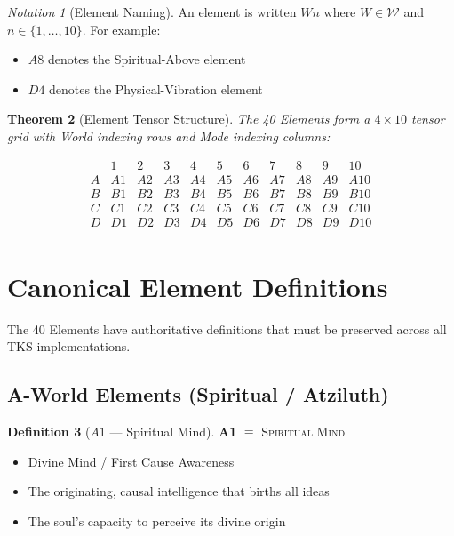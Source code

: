 \documentclass[11pt,twoside,openright]{book}
\theoremstyle{definition}
\newtheorem{definition}{Definition}[chapter]
\theoremstyle{plain}
\newtheorem{theorem}[definition]{Theorem}
\theoremstyle{remark}
\newtheorem{notation}[definition]{Notation}
\newcommand{\Worlds}{\mathcal{W}}
\begin{document}
\begin{notation}[Element Naming]
An element is written $Wn$ where $W \in \Worlds$ and $n \in \{1,\ldots,10\}$. For example:
\begin{itemize}
  \item $A8$ denotes the Spiritual-Above element
  \item $D4$ denotes the Physical-Vibration element
\end{itemize}
\end{notation}

\begin{theorem}[Element Tensor Structure]
\label{thm:element-tensor}
The 40 Elements form a $4 \times 10$ tensor grid with World indexing rows and Mode indexing columns:

\[
\begin{array}{c|cccccccccc}
 & 1 & 2 & 3 & 4 & 5 & 6 & 7 & 8 & 9 & 10 \\
\hline
A & A1 & A2 & A3 & A4 & A5 & A6 & A7 & A8 & A9 & A10 \\
B & B1 & B2 & B3 & B4 & B5 & B6 & B7 & B8 & B9 & B10 \\
C & C1 & C2 & C3 & C4 & C5 & C6 & C7 & C8 & C9 & C10 \\
D & D1 & D2 & D3 & D4 & D5 & D6 & D7 & D8 & D9 & D10 \\
\end{array}
\]
\end{theorem}

\section{Canonical Element Definitions}

The 40 Elements have authoritative definitions that must be preserved across all TKS implementations.

\subsection{A-World Elements (Spiritual / Atziluth)}

\begin{definition}[$A1$ --- Spiritual Mind]
\label{def:A1}
\textbf{A1} $\equiv$ \textsc{Spiritual Mind}
\begin{itemize}
  \item Divine Mind / First Cause Awareness
  \item The originating, causal intelligence that births all ideas
  \item The soul's capacity to perceive its divine origin
\end{itemize}
\end{definition}
\end{document}
